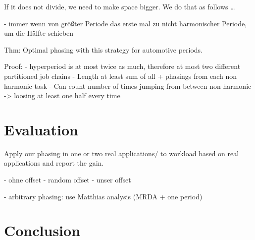 \documentclass[conference]{resources/IEEEtran}
\theoremstyle{definition}
\theoremstyle{remark}
\begin{document}
	If it does not divide, we need to make space bigger. We do that as follows \dots

	- immer wenn von größter Periode das erste mal zu nicht harmonischer Periode, um die Hälfte schieben 

	Thm: Optimal phasing with this strategy for automotive periods. 

	Proof: 
	- hyperperiod is at most twice as much, therefore at most two different partitioned job chains 
	- Length at least sum of all + phasings from each non harmonic task 
	- Can count number of times jumping from between non harmonic -> loosing at least one half every time 



\section{Evaluation}
\label{sec:evaluation}
	
	Apply our phasing in one or two real applications/ to workload based on real applications and report the gain. 


	- ohne offset
	- random offset
	- unser offset 

	- arbitrary phasing: use Matthias analysis (MRDA + one period)
	
\section{Conclusion}
\label{sec:conclusion}
	


\label{last-page}
\clearpage
%
%
	
\end{document}
